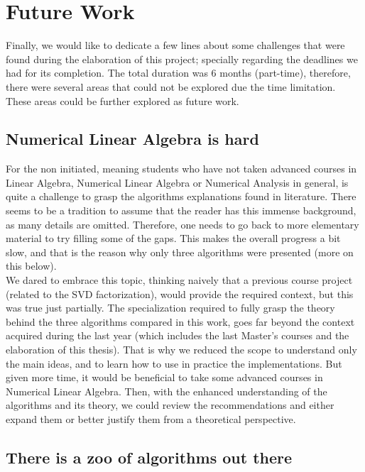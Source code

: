 \section{Future Work}

Finally, we would like to dedicate a few lines about some challenges
that were found during the elaboration of this project; specially
regarding the deadlines we had for its completion. The total
duration was 6 months (part-time), therefore, there were several areas
that could not be explored due the time limitation. These areas could
be further explored as future work. 

\subsection{Numerical Linear Algebra is hard}

For the non initiated, meaning students who have not taken advanced
courses in Linear Algebra,  Numerical Linear Algebra or Numerical
Analysis in general, is quite a challenge to grasp the algorithms
explanations found in literature. There seems to be a tradition to
assume that the reader has this immense background, as many details
are omitted. Therefore, one needs to go back to more elementary
material to try filling some of the gaps. This makes the overall
progress a bit slow, and that is the reason why only three algorithms
were presented (more on this below). \\

We dared to embrace this topic, thinking naively that a previous
course project (related to the SVD factorization), would provide
the required context, but this was 
true just partially. The specialization required to fully grasp the
theory behind the three algorithms compared in this work, goes far beyond
the context acquired during the last year (which includes the last
Master's courses and the elaboration of this thesis). That is why we
reduced the scope to understand only the main ideas, and to learn how
to use in practice the implementations. But given more time, it would
be beneficial to take some advanced courses in Numerical Linear
Algebra. Then, with the enhanced understanding of the algorithms and its
theory, we could review the recommendations and either expand them or
better justify them from a theoretical perspective.


\subsection{There is a zoo of algorithms out there}

